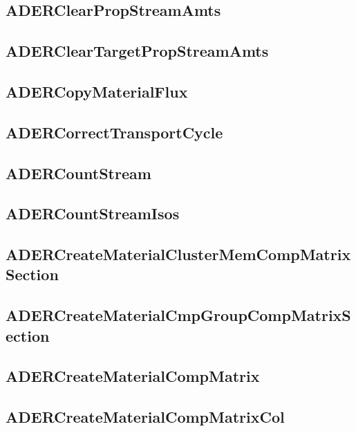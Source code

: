\subsection{ADERClearPropStreamAmts}


\subsection{ADERClearTargetPropStreamAmts}


\subsection{ADERCopyMaterialFlux}


\subsection{ADERCorrectTransportCycle}


\subsection{ADERCountStream}


\subsection{ADERCountStreamIsos}


\subsection{ADERCreateMaterialClusterMemCompMatrixSection}


\subsection{ADERCreateMaterialCmpGroupCompMatrixSection}


\subsection{ADERCreateMaterialCompMatrix}


\subsection{ADERCreateMaterialCompMatrixCol}



